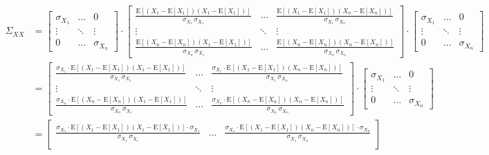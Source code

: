 \documentclass[a4paper,12pt,twoside]{book}
\begin{document}
\begin{equation} \label{eq:covmat-corrmat-covmat-corrmat-s2}
\begin{split}
\Sigma_{XX} &=
\begin{bmatrix}
\sigma_{X_1} & \ldots & 0 \\
\vdots & \ddots & \vdots \\
0 & \ldots & \sigma_{X_n}
\end{bmatrix} \cdot
\begin{bmatrix}
\frac{\mathrm{E}\left[(X_1-\mathrm{E}[X_1]) (X_1-\mathrm{E}[X_1])\right]}{\sigma_{X_1} \, \sigma_{X_1}} & \ldots & \frac{\mathrm{E}\left[(X_1-\mathrm{E}[X_1]) (X_n-\mathrm{E}[X_n])\right]}{\sigma_{X_1} \, \sigma_{X_n}} \\
\vdots & \ddots & \vdots \\
\frac{\mathrm{E}\left[(X_n-\mathrm{E}[X_n]) (X_1-\mathrm{E}[X_1])\right]}{\sigma_{X_n} \, \sigma_{X_1}} & \ldots & \frac{\mathrm{E}\left[(X_n-\mathrm{E}[X_n]) (X_n-\mathrm{E}[X_n])\right]}{\sigma_{X_n} \, \sigma_{X_n}}
\end{bmatrix} \cdot
\begin{bmatrix}
\sigma_{X_1} & \ldots & 0 \\
\vdots & \ddots & \vdots \\
0 & \ldots & \sigma_{X_n}
\end{bmatrix} \\
&=
\begin{bmatrix}
\frac{\sigma_{X_1} \cdot \mathrm{E}\left[(X_1-\mathrm{E}[X_1]) (X_1-\mathrm{E}[X_1])\right]}{\sigma_{X_1} \, \sigma_{X_1}} & \ldots & \frac{\sigma_{X_1} \cdot \mathrm{E}\left[(X_1-\mathrm{E}[X_1]) (X_n-\mathrm{E}[X_n])\right]}{\sigma_{X_1} \, \sigma_{X_n}} \\
\vdots & \ddots & \vdots \\
\frac{\sigma_{X_n} \cdot \mathrm{E}\left[(X_n-\mathrm{E}[X_n]) (X_1-\mathrm{E}[X_1])\right]}{\sigma_{X_n} \, \sigma_{X_1}} & \ldots & \frac{\sigma_{X_n} \cdot \mathrm{E}\left[(X_n-\mathrm{E}[X_n]) (X_n-\mathrm{E}[X_n])\right]}{\sigma_{X_n} \, \sigma_{X_n}}
\end{bmatrix} \cdot
\begin{bmatrix}
\sigma_{X_1} & \ldots & 0 \\
\vdots & \ddots & \vdots \\
0 & \ldots & \sigma_{X_n}
\end{bmatrix} \\
&=
\begin{bmatrix}
\frac{\sigma_{X_1} \cdot \mathrm{E}\left[(X_1-\mathrm{E}[X_1]) (X_1-\mathrm{E}[X_1])\right] \cdot \sigma_{X_1}}{\sigma_{X_1} \, \sigma_{X_1}} & \ldots & \frac{\sigma_{X_1} \cdot \mathrm{E}\left[(X_1-\mathrm{E}[X_1]) (X_n-\mathrm{E}[X_n])\right] \cdot \sigma_{X_n}}{\sigma_{X_1} \, \sigma_{X_n}} \\

\end{bmatrix}
\end{split}
\end{equation}
\end{document}
